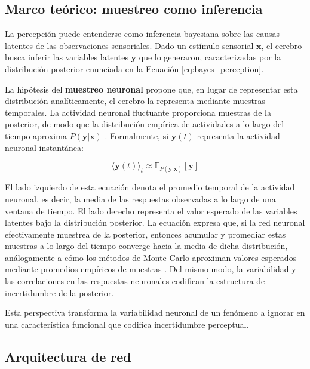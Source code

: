 \subsection{Marco teórico: muestreo como inferencia}
\label{subsec:echeveste_marco}

La percepción puede entenderse como inferencia bayesiana sobre las causas latentes de las observaciones sensoriales. Dado un estímulo sensorial $\mathbf{x}$, el cerebro busca inferir las variables latentes $\mathbf{y}$ que lo generaron, caracterizadas por la distribución posterior enunciada en la Ecuación \ref{eq:bayes_perception}.

La hipótesis del \textbf{muestreo neuronal} propone que, en lugar de representar esta distribución analíticamente, el cerebro la representa mediante muestras temporales. La actividad neuronal fluctuante proporciona muestras de la posterior, de modo que la distribución empírica de actividades a lo largo del tiempo aproxima $P(\mathbf{y}|\mathbf{x})$ \citep{echeveste2020cortical}. Formalmente, si $\mathbf{y}(t)$ representa la actividad neuronal instantánea:

\begin{equation}
\langle \mathbf{y}(t) \rangle_t \approx \mathbb{E}_{P(\mathbf{y}|\mathbf{x})}[\mathbf{y}]
\label{eq:neural_sampling_mean}
\end{equation}

El lado izquierdo de esta ecuación denota el promedio temporal de la actividad neuronal, es decir, la media de las respuestas observadas a lo largo de una ventana de tiempo. El lado derecho representa el valor esperado de las variables latentes bajo la distribución posterior. La ecuación expresa que, si la red neuronal efectivamente muestrea de la posterior, entonces acumular y promediar estas muestras a lo largo del tiempo converge hacia la media de dicha distribución, análogamente a cómo los métodos de Monte Carlo aproximan valores esperados mediante promedios empíricos de muestras \citep{gerstner2002spiking}. Del mismo modo, la variabilidad y las correlaciones en las respuestas neuronales codifican la estructura de incertidumbre de la posterior.

Esta perspectiva transforma la variabilidad neuronal de un fenómeno a ignorar en una característica funcional que codifica incertidumbre perceptual.

\subsection{Arquitectura de red}
\label{subsec:echeveste_arquitectura}

